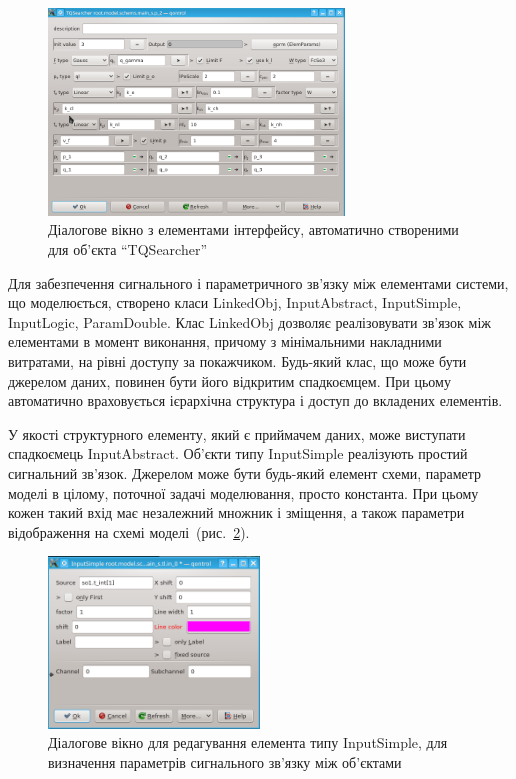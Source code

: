 \begin{figure}[htb!]
  \begin{center}
    \includegraphics[width=0.7\textwidth]{p/qontrol_tqsearch.png}
  \end{center}
\caption{Діалогове вікно з елементами інтерфейсу, автоматично створеними для об'єкта ``TQSearcher''}
  \label{atu:f:qontrol_qsearch}
\end{figure}

Для забезпечення сигнального і параметричного зв'язку
між елементами системи, що моделюється, створено класи
LinkedObj, InputAbstract, InputSimple, InputLogic, ParamDouble. Клас LinkedObj дозволяє
реалізовувати зв'язок між елементами в момент виконання,
причому з мінімальними накладними витратами, на рівні
доступу за покажчиком. Будь-який клас, що може бути джерелом
даних, повинен бути його відкритим спадкоємцем. При цьому
автоматично враховується ієрархічна структура і доступ
до вкладених елементів.

У якості структурного елементу, який є
приймачем даних, може виступати спадкоємець InputAbstract. Об'єкти
типу InputSimple реалізують простий сигнальний зв'язок. Джерелом
може бути будь-який елемент схеми, параметр моделі в цілому,
поточної задачі моделювання, просто константа. При цьому кожен
такий вхід має незалежний множник і зміщення, а також параметри
відображення на схемі моделі~(рис.~\ref{atu:f:qontrol_link}).


\begin{figure}[htb!]
  \begin{center}
    \includegraphics[width=0.5\textwidth]{p/qontrol_link.png}
  \end{center}
\caption{Діалогове вікно для редагування елемента типу InputSimple, для визначення параметрів сигнального зв'язку між об'єктами}
  \label{atu:f:qontrol_link}
\end{figure}

